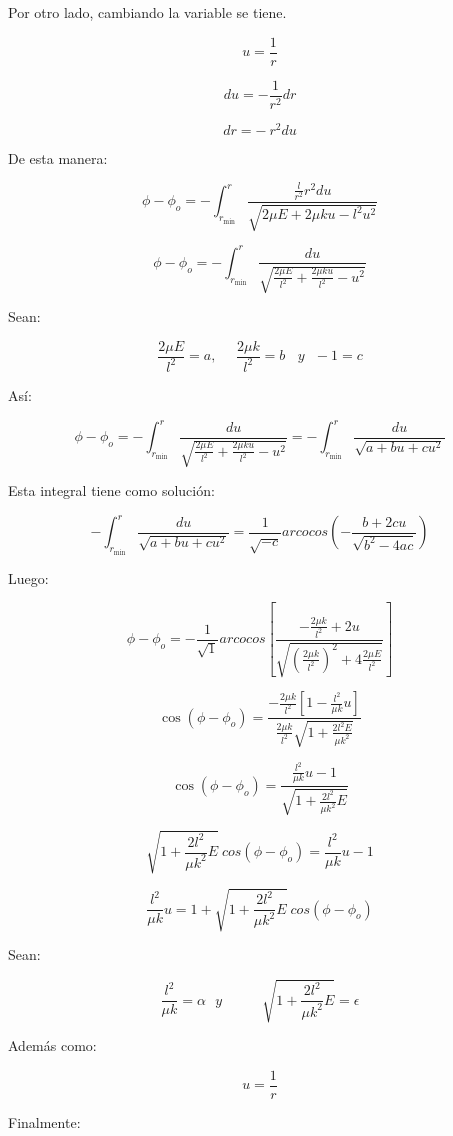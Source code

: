 \documentclass[]{article}
\begin{document}
Por otro lado, cambiando la variable se tiene.

\[u = \frac{1}{r}\]

\[du = - \frac{1}{r^{2}}dr\]

\[dr = - \ r^{2}du\]

De esta manera:

\[\phi - \phi_{o} = - \int_{r_{\min}}^{r}\frac{\frac{l}{r^{2}}r^{2}du}{\sqrt{2\mu E + 2\mu ku - l^{2}u^{2}}}\]

\[\phi - \phi_{o} = - \int_{r_{\min}}^{r}\frac{du}{\sqrt{\frac{2\mu E}{l^{2}} + \frac{2\mu ku}{l^{2}} - u^{2}}}\]

Sean:

\[\frac{2\mu E}{l^{2}} = a,\ \ \ \ \ \ \frac{2\mu k}{l^{2}} = b\ \ \ \ y\ \ \  - 1 = c\]

Así:

\[\phi - \phi_{o} = - \int_{r_{\min}}^{r}{\frac{du}{\sqrt{\frac{2\mu E}{l^{2}} + \frac{2\mu ku}{l^{2}} - u^{2}}} = - \int_{r_{\min}}^{r}\frac{du}{\sqrt{a + bu + cu^{2}}}}\]

Esta integral tiene como solución:

\[- \int_{r_{\min}}^{r}\frac{du}{\sqrt{a + bu + cu^{2}}} = \frac{1}{\sqrt{- c}}arcocos\left( - \frac{b + 2cu}{\sqrt{b^{2} - 4ac}} \right)\]

Luego:

\[\phi - \phi_{o} = - \frac{1}{\sqrt{1}}arcocos\left\lbrack \frac{- \frac{2\mu k}{l^{2}} + 2u}{\sqrt{\left( \frac{2\mu k}{l^{2}} \right)^{2} + 4\frac{2\mu E}{l^{2}}}} \right\rbrack\]

\[\cos\left( \phi - \phi_{o} \right) = \frac{- \frac{2\mu k}{l^{2}}\left\lbrack 1 - \frac{l^{2}}{\mu k}u \right\rbrack}{\frac{2\mu k}{l^{2}}\sqrt{1 + \frac{2l^{2}E}{\mu k^{2}}}}\]

\[\cos\left( \phi - \phi_{o} \right) = \frac{\frac{l^{2}}{\mu k}u - 1}{\sqrt{1 + \frac{2l^{2}}{\mu k^{2}}E}}\]

\[\sqrt{1 + \frac{2l^{2}}{\mu k^{2}}E}\ cos\left( \phi - \phi_{o} \right) = \frac{l^{2}}{\mu k}u - 1\]

\[\frac{l^{2}}{\mu k}u = 1 + \sqrt{1 + \frac{2l^{2}}{\mu k^{2}}E}\ cos\left( \phi - \phi_{o} \right)\]

Sean:

\[\frac{l^{2}}{\mu k} = \alpha\ \ \ y\ \ \ \ \ \ \ \ \ \ \ \ \ \sqrt{1 + \frac{2l^{2}}{\mu k^{2}}E} = \epsilon\]

Además como:

\[u = \frac{1}{r}\]

Finalmente:
\end{document}
